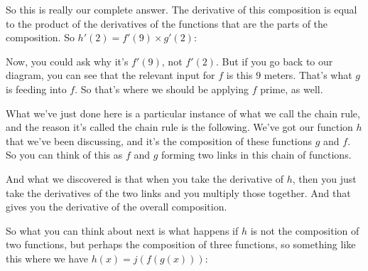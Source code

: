 \documentclass[pdftex, brazil, 12pt, twoside]{article}
\begin{document}
So this is really our complete answer.
The derivative of this composition
is equal to the product of the derivatives
of the functions that are the parts of the composition.
So $h'(2)=f'(9) \times g'(2)$:

\begin{figure}[H]
  \begin{center}
  \end{center}
\end{figure}

Now, you could ask why it's $f'(9)$, not $f'(2)$.
But if you go back to our diagram,
you can see that the relevant input for $f$ is this $9$ meters.
That's what $g$ is feeding into $f$.
So that's where we should be applying $f$ prime, as well.

What we've just done here is a particular instance
of what we call the chain rule, and the reason
it's called the chain rule is the following.
We've got our function $h$ that we've been discussing,
and it's the composition of these functions $g$ and $f$.
So you can think of this as $f$ and $g$ forming two links
in this chain of functions.

And what we discovered is that when
you take the derivative of $h$, then you just take
the derivatives of the two links and you
multiply those together.
And that gives you the derivative
of the overall composition.

So what you can think about next is
what happens if $h$ is not the composition of two functions,
but perhaps the composition of three functions,
so something like this where we have $h(x)= j(f(g(x)))$:
\end{document}

